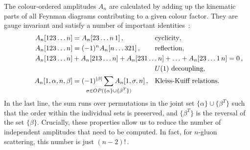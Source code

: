 \documentclass[main.tex]{subfiles}
\begin{document}
The colour-ordered amplitudes $A_n$ are calculated by adding up the kinematic parts of all Feynman diagrams contributing to a given colour factor. They are gauge invariant and satisfy a number of important identities~\cite{Mangano:1990by, Kleiss:1989616, Bern:2008qj}:
\begin{align}
    A_n[123\ldots n] &= A_n[23\ldots n\,1]\,, && \text{cyclicity}, \\
    A_n[123\ldots n] &= (-1)^n A_n[n \ldots 321] \,, && \text{reflection}, \\
    A_n[123 \ldots n] &+ \mathrlap{A_n[213 \ldots n] +  A_n[231 \ldots n] +  \ldots + A_n[23 \ldots 1\,n] = 0 \,,} && \nonumber \\ 
    & && U(1) \text{ decoupling}, \\
    A_n[1, {\alpha}, n, {\beta}] &= (-1)^{|\beta|} \sum_{\mathclap{\sigma \in OP(\{\alpha\} \cup \{\beta^T\})}} A_n[1, \sigma, n] \,, && \text{Kleiss-Kuiff relations}.
\end{align}
In the last line, the sum runs over permutations in the joint set $\{\alpha\} \cup \{\beta^T\}$ such that the order within the individual sets is preserved, and $\{\beta^T\}$ is the reversal of the set $\{\beta\}$. Crucially, these properties allow us to reduce the number of independent amplitudes that need to be computed. In fact, for $n$-gluon scattering, this number is just $(n-2)!$\,.
\end{document}

